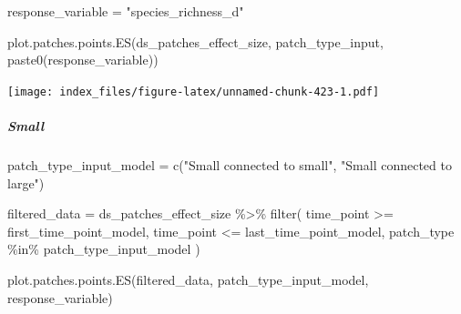 \documentclass[
]{article}
\newenvironment{Shaded}{\begin{snugshade}}{\end{snugshade}}
\newcommand{\FunctionTok}[1]{\textcolor[rgb]{0.00,0.00,0.00}{#1}}
\newcommand{\NormalTok}[1]{#1}
\newcommand{\OtherTok}[1]{\textcolor[rgb]{0.56,0.35,0.01}{#1}}
\newcommand{\SpecialCharTok}[1]{\textcolor[rgb]{0.00,0.00,0.00}{#1}}
\newcommand{\StringTok}[1]{\textcolor[rgb]{0.31,0.60,0.02}{#1}}
\begin{document}
\begin{Shaded}
\begin{Highlighting}[]
\NormalTok{response\_variable }\OtherTok{=} \StringTok{"species\_richness\_d"}
\end{Highlighting}
\end{Shaded}

\begin{Shaded}
\begin{Highlighting}[]
\FunctionTok{plot.patches.points.ES}\NormalTok{(ds\_patches\_effect\_size, }
\NormalTok{                       patch\_type\_input,}
                       \FunctionTok{paste0}\NormalTok{(response\_variable))}
\end{Highlighting}
\end{Shaded}

\texttt{[image: index\_files/figure-latex/unnamed-chunk-423-1.pdf]}

\hypertarget{small-3}{%
\subparagraph{Small}\label{small-3}}

\begin{Shaded}
\begin{Highlighting}[]
\NormalTok{patch\_type\_input\_model }\OtherTok{=} \FunctionTok{c}\NormalTok{(}\StringTok{"Small connected to small"}\NormalTok{,}
                           \StringTok{"Small connected to large"}\NormalTok{)}
\end{Highlighting}
\end{Shaded}

\begin{Shaded}
\begin{Highlighting}[]
\NormalTok{filtered\_data }\OtherTok{=}\NormalTok{ ds\_patches\_effect\_size }\SpecialCharTok{\%\textgreater{}\%}
  \FunctionTok{filter}\NormalTok{(}
\NormalTok{    time\_point }\SpecialCharTok{\textgreater{}=}\NormalTok{ first\_time\_point\_model,}
\NormalTok{    time\_point }\SpecialCharTok{\textless{}=}\NormalTok{ last\_time\_point\_model,}
\NormalTok{    patch\_type }\SpecialCharTok{\%in\%}\NormalTok{ patch\_type\_input\_model}
\NormalTok{  )}
\end{Highlighting}
\end{Shaded}

\begin{Shaded}
\begin{Highlighting}[]
\FunctionTok{plot.patches.points.ES}\NormalTok{(filtered\_data,}
\NormalTok{                       patch\_type\_input\_model,}
\NormalTok{                       response\_variable)}
\end{Highlighting}
\end{Shaded}
\end{document}
